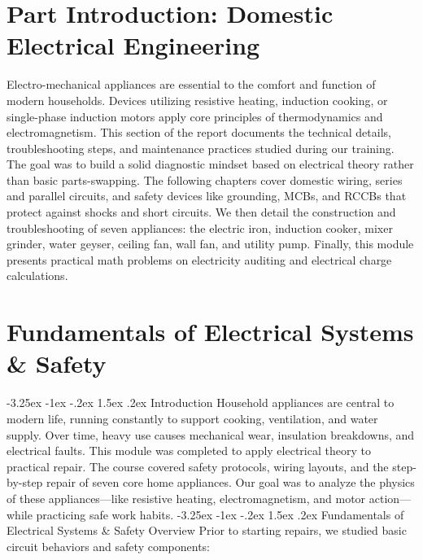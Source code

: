 \documentclass[11pt,a4paper]{report}
\makeatletter
\renewcommand{\section}{\@startsection{section}{1}{\z@}%
  {-3.25ex \@plus -1ex \@minus -.2ex}%
  {1.5ex \@plus.2ex}%
  {\normalfont\Large\bfseries\color{primaryColor}}}
\makeatother
\begin{document}
\chapter*{Part Introduction: Domestic Electrical Engineering}
Electro-mechanical appliances are essential to the comfort and function of modern households. Devices utilizing resistive heating, induction cooking, or single-phase induction motors apply core principles of thermodynamics and electromagnetism. This section of the report documents the technical details, troubleshooting steps, and maintenance practices studied during our training. The goal was to build a solid diagnostic mindset based on electrical theory rather than basic parts-swapping. The following chapters cover domestic wiring, series and parallel circuits, and safety devices like grounding, MCBs, and RCCBs that protect against shocks and short circuits. We then detail the construction and troubleshooting of seven appliances: the electric iron, induction cooker, mixer grinder, water geyser, ceiling fan, wall fan, and utility pump. Finally, this module presents practical math problems on electricity auditing and electrical charge calculations.
\chapter{Fundamentals of Electrical Systems \& Safety}
\section{Introduction}
Household appliances are central to modern life, running constantly to support cooking, ventilation, and water supply. Over time, heavy use causes mechanical wear, insulation breakdowns, and electrical faults. This module was completed to apply electrical theory to practical repair. The course covered safety protocols, wiring layouts, and the step-by-step repair of seven core home appliances. Our goal was to analyze the physics of these appliances—like resistive heating, electromagnetism, and motor action—while practicing safe work habits.
\section{Fundamentals of Electrical Systems \& Safety Overview}
Prior to starting repairs, we studied basic circuit behaviors and safety components:
\end{document}

